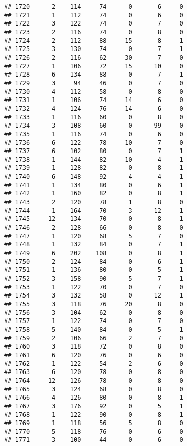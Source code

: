 \documentclass[
]{article}
\begin{document}
\begin{verbatim}
## 1720      2    114     74      0       6     0
## 1721      1    112     74      0       6     0
## 1722      3    122     74      0       7     0
## 1723      2    116     74      0       8     0
## 1724      2    112     88     15       8     1
## 1725      3    130     74      0       7     1
## 1726      2    116     62     30       7     0
## 1727      1    106     72     15      10     0
## 1728      6    134     88      0       7     1
## 1729      3     94     46      0       7     0
## 1730      4    112     58      0       8     0
## 1731      1    106     74     14       6     0
## 1732      4    124     76     14       6     0
## 1733      1    116     60      0       8     0
## 1734      3    108     60      0      99     0
## 1735      1    116     74      0       6     0
## 1736      6    122     78     10       7     0
## 1737      6    102     80      0       7     1
## 1738      1    144     82     10       4     1
## 1739      1    128     82      0       8     1
## 1740      6    148     92      4       4     1
## 1741      1    134     80      0       6     1
## 1742      1    160     82      0       8     1
## 1743      2    120     78      1       8     0
## 1744      1    164     70      3      12     1
## 1745     12    134     70      0       8     1
## 1746      2    128     66      0       8     0
## 1747      1    120     68      5       7     0
## 1748      1    132     84      0       7     1
## 1749      6    202    108      0       8     1
## 1750      2    124     84      0       6     1
## 1751      1    136     80      0       5     1
## 1752      3    158     90      5       7     1
## 1753      1    122     70      0       7     0
## 1754      3    132     58      0      12     1
## 1755      3    118     76     20       8     0
## 1756      3    104     62      0       8     0
## 1757      1    122     74      0       7     0
## 1758      5    140     84      0       5     1
## 1759      2    106     66      2       7     0
## 1760      3    118     72      0       8     0
## 1761      6    120     76      0       6     0
## 1762      1    122     54      2       6     0
## 1763      6    120     78      0       8     0
## 1764     12    126     78      0       8     0
## 1765      3    124     68      0       8     0
## 1766      4    126     80      0       8     1
## 1767      3    176     92      0       5     1
## 1768      1    122     90      0       8     1
## 1769      1    118     56      5       8     0
## 1770      5    118     76      0       6     0
## 1771      3    100     44      0       6     0

\end{verbatim}
\end{document}

